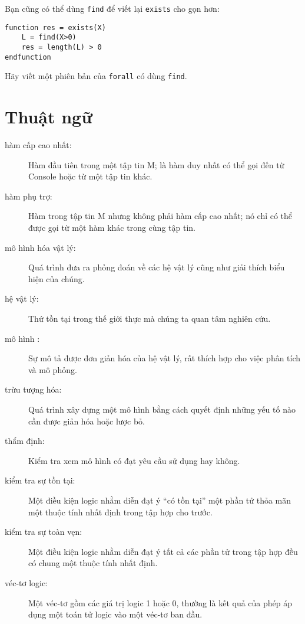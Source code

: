 \documentclass[12pt]{book}
\begin{document}
Bạn cũng có thể dùng {\tt find} để viết lại {\tt exists} cho gọn hơn:

\begin{verbatim}
function res = exists(X)
    L = find(X>0)
    res = length(L) > 0
endfunction
\end{verbatim}
%
\begin{ex}
Hãy viết một phiên bản của {\tt forall} có dùng {\tt find}.
\end{ex}


\section{Thuật ngữ}

\begin{description}

\item[hàm cấp cao nhất:]  Hàm đầu tiên trong một tập tin M;
là hàm duy nhất có thể gọi đến từ Console hoặc từ
một tập tin khác.

\item[hàm phụ trợ:] Hàm trong tập tin M nhưng không phải
hàm cấp cao nhất; nó chỉ có thể được gọi từ một hàm khác
trong cùng tập tin.

\item[mô hình hóa vật lý:] Quá trình đưa ra phỏng đoán về các
hệ vật lý cũng như giải thích biểu hiện của chúng.

\item[hệ vật lý:] Thứ tồn tại trong thế giới thực mà chúng ta
quan tâm nghiên cứu.

\item[mô hình :] Sự mô tả được đơn giản hóa của hệ vật lý,
rất thích hợp cho việc phân tích và mô phỏng.

\item[trừu tượng hóa:] Quá trình xây dựng một mô hình bằng cách
quyết định những yếu tố nào cần được giản hóa hoặc lược bỏ.

\item[thẩm định:] Kiểm tra xem mô hình có đạt yêu cầu sử dụng
hay không.

\item[kiểm tra sự tồn tại:] Một điều kiện logic nhằm diễn đạt ý
``có tồn tại'' một phần tử thỏa mãn một thuộc tính nhất định 
trong tập hợp cho trước.

\item[kiểm tra sự toàn vẹn:] Một điều kiện logic nhằm diễn đạt ý
tất cả các phần tử trong tập hợp đều có chung một thuộc tính nhất định.

\item[véc-tơ logic:] Một véc-tơ gồm các giá trị logic 1 hoặc 0, 
thường là kết quả của phép áp dụng một toán tử logic vào một 
véc-tơ ban đầu.


\end{description}
\end{document}

